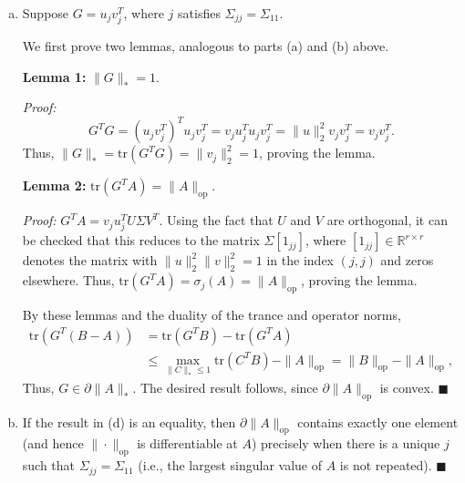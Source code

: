 \documentclass[11pt]{article}
\newcommand{\qed}{\quad \ensuremath{\blacksquare}}
\newcommand{\R}{\mathbb{R}}
\newcommand{\op}{{\operatorname{op}}}
\newcommand{\tr}{\mathrm{tr}}
\begin{document}
\begin{enumerate}[(a)]
\item Suppose $G = u_jv_j^T$, where $j$ satisfies $\Sigma_{jj} = \Sigma_{11}$.

We first prove two lemmas, analogous to parts (a) and (b) above.

{\bf Lemma 1:} $\|G\|_* = 1$.

\emph{Proof:}
\[G^TG
    = (u_jv_j^T)^T u_jv_j^T
    = v_ju_j^Tu_jv_j^T
    = \|u\|_2^2v_jv_j^T
    = v_jv_j^T.
\]
Thus, $\|G\|_* = \tr(G^TG) = \|v_j\|_2^2 = 1$, proving the lemma.

{\bf Lemma 2:} $\tr(G^TA) = \|A\|_\op$.

\emph{Proof:} $G^TA = v_ju_j^TU\Sigma V^T$. Using the fact that $U$ and $V$ are
orthogonal, it can be checked that this reduces to the matrix $\Sigma[1_{jj}]$,
where $[1_{jj}] \in \R^{r \times r}$ denotes the matrix with
$\|u\|_2^2\|v\|_2^2 = 1$ in the index $(j,j)$ and zeros elsewhere. Thus,
$\tr(G^TA) = \sigma_j(A) = \|A\|_\op$, proving the lemma.

By these lemmas and the duality of the trance and operator norms,
\begin{align*}
\tr( G^T (B - A) )
 &  = \tr( G^T B ) - \tr( G^T A )         \\
 &  \leq \max_{\|C\|_* \leq 1} \tr(C^TB) - \|A\|_\op
    = \|B\|_\op - \|A\|_\op,
\end{align*}
Thus, $G \in \partial\|A\|_*$. The desired result follows, since
$\partial\|A\|_\op$ is convex. \qed

\item If the result in (d) is an equality, then $\partial\|A\|_\op$ contains
exactly one element (and hence $\|\cdot\|_\op$ is differentiable at $A$)
precisely when there is a unique $j$ such that $\Sigma_{jj} = \Sigma_{11}$
(i.e., the largest singular value of $A$ is not repeated). \qed
\end{enumerate}
\end{document}
